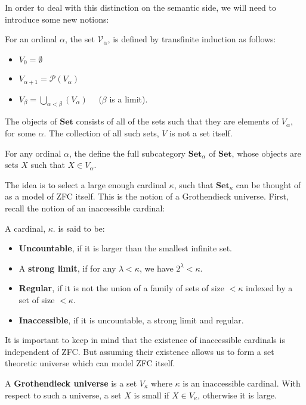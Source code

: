 In order to deal with this distinction on the semantic side, we will need to introduce some new notions:
\begin{defn}For an ordinal $\alpha$, the set $\mathcal{V}_{\alpha}$, is defined by transfinite induction as follows:
  \begin{itemize}
  \item $V_0 = \emptyset$
  \item $V_{\alpha + 1} = \mathcal{P}(V_\alpha)$
  \item $V_{\beta} = \bigcup_{\alpha < \beta}(V_\alpha) \quad $ ($\beta$ is a limit).
  \end{itemize}
\end{defn}
The objects of $\mathbf{Set}$ consists of all of the sets such that they are elements of $V_\alpha$, for some $\alpha$. The collection of all such sets, $V$ is not a set itself.
\begin{defn}
  For any ordinal $\alpha$, the define the full subcategory $\mathbf{Set}_\alpha$ of $\mathbf{Set}$, whose objects are sets $X$ such that $X \in V_\alpha$. 
\end{defn}
The idea is to select a large enough cardinal $\kappa$, such that $\mathbf{Set}_\kappa$ can be thought of as a model of ZFC itself. This is the notion of a Grothendieck universe. First, recall the notion of an inaccessible cardinal:
\begin{defn}A cardinal, $\kappa$. is said to be:
  \begin{itemize}
  \item \textbf{Uncountable}, if it is larger than the smallest infinite set.
  \item A \textbf{strong limit}, if for any $\lambda < \kappa$, we have $2^\lambda < \kappa$.
  \item \textbf{Regular}, if it is not the union of a family of sets of size  $<\kappa$ indexed by a set of size $< \kappa$.
  \item \textbf{Inaccessible}, if it is uncountable, a strong limit and regular.
  \end{itemize}
\end{defn}
It is important to keep in mind that the existence of inaccessible cardinals is independent of ZFC. But assuming their existence allows us to form a set theoretic universe which can model ZFC itself.
\begin{defn}A \textbf{Grothendieck universe} is a set $V_\kappa$ where $\kappa$ is an inaccessible cardinal. With respect to such a universe, a set $X$ is small if $X \in V_\kappa$, otherwise it is large.
\end{defn}
